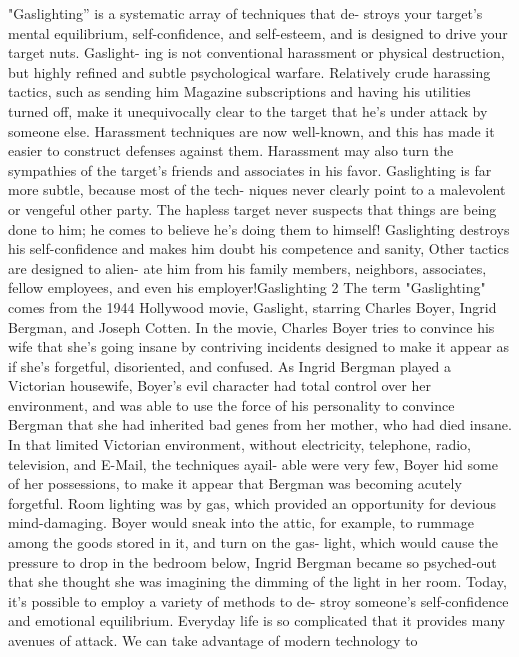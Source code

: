 \documentclass{book}
\begin{document}
"Gaslighting” is a systematic array of techniques that de- 
stroys your target's mental equilibrium, self-confidence, and 
self-esteem, and is designed to drive your target nuts. Gaslight- 
ing is not conventional harassment or physical destruction, but 
highly refined and subtle psychological warfare. 
Relatively crude harassing tactics, such as sending him 
Magazine subscriptions and having his utilities turned off, 
make it unequivocally clear to the target that he's under attack 
by someone else. Harassment techniques are now well-known, 
and this has made it easier to construct defenses against them. 
Harassment may also turn the sympathies of the target's friends 
and associates in his favor. 
Gaslighting is far more subtle, because most of the tech- 
niques never clearly point to a malevolent or vengeful other 
party. The hapless target never suspects that things are being 
done to him; he comes to believe he's doing them to himself! 
Gaslighting destroys his self-confidence and makes him doubt 
his competence and sanity, Other tactics are designed to alien- 
ate him from his family members, neighbors, associates, fellow 
employees, and even his employer!Gaslighting 
2 
The term "Gaslighting" comes from the 1944 Hollywood 
movie, Gaslight, starring Charles Boyer, Ingrid Bergman, and 
Joseph Cotten. In the movie, Charles Boyer tries to convince his 
wife that she's going insane by contriving incidents designed to 
make it appear as if she's forgetful, disoriented, and confused. 
As Ingrid Bergman played a Victorian housewife, Boyer's evil 
character had total control over her environment, and was able 
to use the force of his personality to convince Bergman that she 
had inherited bad genes from her mother, who had died insane. 
In that limited Victorian environment, without electricity, 
telephone, radio, television, and E-Mail, the techniques ayail- 
able were very few, Boyer hid some of her possessions, to make 
it appear that Bergman was becoming acutely forgetful. Room 
lighting was by gas, which provided an opportunity for devious 
mind-damaging. Boyer would sneak into the attic, for example, 
to rummage among the goods stored in it, and turn on the gas- 
light, which would cause the pressure to drop in the bedroom 
below, Ingrid Bergman became so psyched-out that she thought 
she was imagining the dimming of the light in her room. 
Today, it’s possible to employ a variety of methods to de- 
stroy someone's self-confidence and emotional equilibrium. 
Everyday life is so complicated that it provides many avenues 
of attack. We can take advantage of modern technology to 
\end{document}
